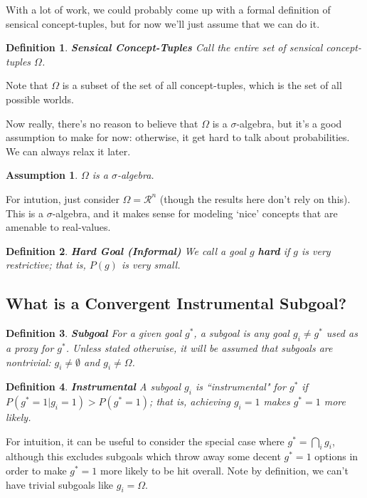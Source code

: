 \documentclass{article}
\newtheorem{definition}{Definition}
\newtheorem{assumption}{Assumption}
\begin{document}
With a lot of work, we could probably come up with a formal definition of sensical concept-tuples, but for now we'll just assume that we can do it.

\begin{definition}{\textbf{Sensical Concept-Tuples}}
    Call the entire set of sensical concept-tuples $\Omega$.
\end{definition}

Note that $\Omega$ is a subset of the set of all concept-tuples, which is the set of all possible worlds.

Now really, there's no reason to believe that $\Omega$ is a $\sigma$-algebra, but it's a good assumption to make for now: otherwise, it get hard to talk about probabilities. We can always relax it later.

\begin{assumption}{}
    $\Omega$ is a $\sigma$-algebra.
\end{assumption}

For intution, just consider $\Omega=\mathcal{R}^n$ (though the results here don't rely on this). This is a $\sigma$-algebra, and it makes sense for modeling `nice' concepts that are amenable to real-values. 

\begin{definition}{\textbf{Hard Goal (Informal)}}
    We call a goal $g$ \textbf{hard} if $g$ is very restrictive; that is, $P(g)$ is very small.
\end{definition}

\subsection{What is a Convergent Instrumental Subgoal?}

\begin{definition}{\textbf{Subgoal}}
    For a given goal $g^*$, a subgoal is any goal $g_i \neq g^*$ used as a proxy for $g^*$. Unless stated otherwise, it will be assumed that subgoals are nontrivial: $g_i \neq \emptyset$ and $g_i \neq \Omega$.
\end{definition}

\begin{definition}{\textbf{Instrumental}}
    A subgoal $g_i$ is ``instrumental" for $g^*$ if $P(g^*=1|g_i=1)>P(g^*=1)$; that is, achieving $g_i=1$ makes $g^*=1$ more likely.
\end{definition}

For intuition, it can be useful to consider the special case where $g^* = \bigcap_i g_i$, although this excludes subgoals which throw away some decent $g^*=1$ options in order to make $g^*=1$ more likely to be hit overall. Note by definition, we can't have trivial subgoals like $g_i=\Omega$.
\end{document}
